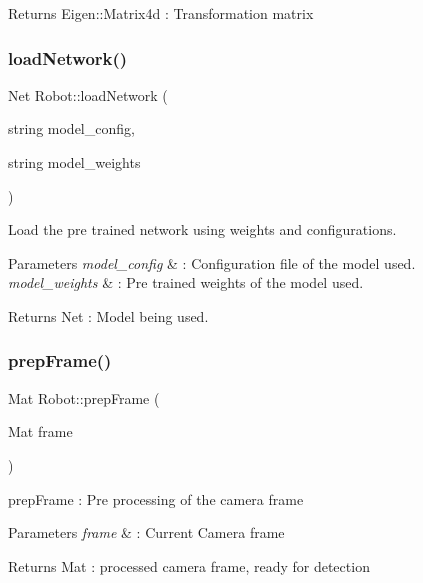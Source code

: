\begin{DoxyReturn}{Returns}
Eigen\+::\+Matrix4d \+: Transformation matrix 
\end{DoxyReturn}
\mbox{\label{classRobot_a082dee8da5e4847ded0a6a1373172073}} 
\subsubsection{\texorpdfstring{load\+Network()}{loadNetwork()}}
{\footnotesize\ttfamily Net Robot\+::load\+Network (\begin{DoxyParamCaption}\item[{string}]{model\+\_\+config,  }\item[{string}]{model\+\_\+weights }\end{DoxyParamCaption})}



Load the pre trained network using weights and configurations. 


\begin{DoxyParams}{Parameters}
{\em model\+\_\+config} & \+: Configuration file of the model used. \\
\hline
{\em model\+\_\+weights} & \+: Pre trained weights of the model used. \\
\hline
\end{DoxyParams}
\begin{DoxyReturn}{Returns}
Net \+: Model being used. 
\end{DoxyReturn}
\mbox{\label{classRobot_a16845345490d84f599e5b469eca208dd}} 
\subsubsection{\texorpdfstring{prep\+Frame()}{prepFrame()}}
{\footnotesize\ttfamily Mat Robot\+::prep\+Frame (\begin{DoxyParamCaption}\item[{Mat}]{frame }\end{DoxyParamCaption})}



prep\+Frame \+: Pre processing of the camera frame 


\begin{DoxyParams}{Parameters}
{\em frame} & \+: Current Camera frame \\
\hline
\end{DoxyParams}
\begin{DoxyReturn}{Returns}
Mat \+: processed camera frame, ready for detection 
\end{DoxyReturn}
\mbox{\label{classRobot_aad2cd63f57d4feaaa7ec92f49ba72d5e}} 

